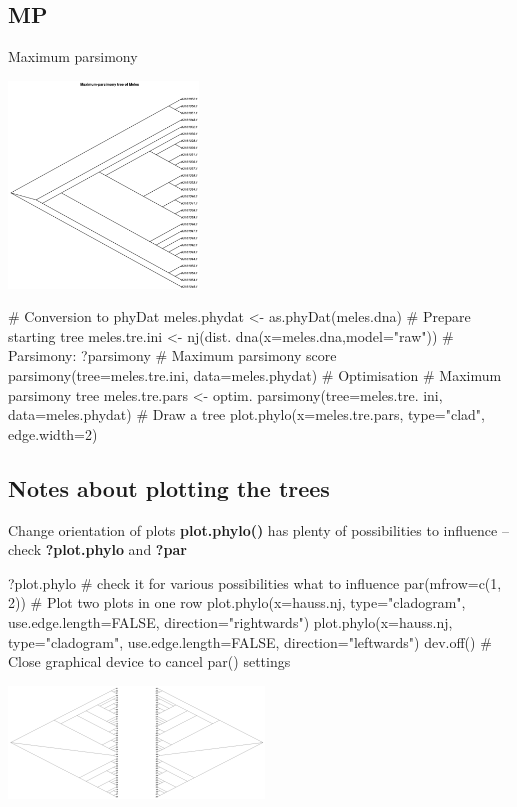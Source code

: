 \documentclass[compress, ucs, xelatex, 11pt, xcolor=svgnames,
  hyperref={
    bookmarks=true,
    unicode=true,
    colorlinks=true,
    pdftitle={Molecular data in R},
    plainpages=false,
    pdfauthor={Vojtech Zeisek},
    pdfsubject={Course about phylogeny and evolution in R},
    pdfcreator={XeLaTeX},
    pdfkeywords={R, evolution, phylogeny, molecular data},
    linkcolor=Tomato,
    anchorcolor=SaddleBrown,
    citecolor=Goldenrod,
    filecolor=DarkMagenta,
    menucolor=Sienna,
    urlcolor=DarkTurquoise,
    pdftex},
  url={hyphens, lowtilde} %
  ]{beamer}
\begin{document}
\subsection{MP}

\begin{frame}[fragile]{Maximum parsimony}
\begin{multicols}{2}
  \includegraphics[height=5.5cm]{parsimony.png}
  \begin{spluscode}
    # Conversion to phyDat
    meles.phydat <-
      as.phyDat(meles.dna)
    # Prepare starting tree
    meles.tre.ini <- nj(dist.
      dna(x=meles.dna,model="raw"))
    # Parsimony: ?parsimony
    # Maximum parsimony score
    parsimony(tree=meles.tre.ini,
      data=meles.phydat)
    # Optimisation
    # Maximum parsimony tree
    meles.tre.pars <- optim.
      parsimony(tree=meles.tre.
      ini, data=meles.phydat)
    # Draw a tree
    plot.phylo(x=meles.tre.pars,
      type="clad", edge.width=2)
  \end{spluscode}
\end{multicols}
\end{frame}

\subsection{Notes about plotting the trees}

\begin{frame}[fragile]{Change orientation of plots}
\textbf{plot.phylo()} has plenty of possibilities to influence -- check \textbf{?plot.phylo} and \textbf{?par}
  \begin{spluscode}
    ?plot.phylo # check it for various possibilities what to influence
    par(mfrow=c(1, 2)) # Plot two plots in one row
    plot.phylo(x=hauss.nj, type="cladogram", use.edge.length=FALSE,
      direction="rightwards")
    plot.phylo(x=hauss.nj, type="cladogram", use.edge.length=FALSE,
      direction="leftwards")
    dev.off() # Close graphical device to cancel par() settings
  \end{spluscode}
\begin{center}
  \includegraphics[height=3cm]{lr.png}
\end{center}
\end{frame}
\end{document}
